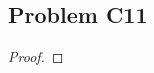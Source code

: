 \documentclass[../../../main.tex]{subfiles}
\begin{document}
\subsection{Problem C11}
\begin{wts}

\end{wts}
\begin{proof}

\end{proof}
\end{document}
